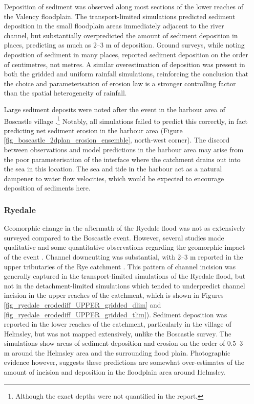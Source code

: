 Deposition of sediment was observed along most sections of the lower reaches of the Valency floodplain. The transport-limited simulations predicted sediment deposition in the small floodplain areas immediately adjacent to the river channel, but substantially overpredicted the amount of sediment deposition in places, predicting as much as 2--3 m of deposition. Ground surveys, while noting deposition of sediment in many places, reported sediment deposition on the order of centimetres, not metres. A similar overestimation of deposition was present in both the gridded and uniform rainfall simulations, reinforcing the conclusion that the choice and parameterisation of erosion law is a stronger controlling factor than the spatial heterogeneity of rainfall.

Large sediment deposits were noted after the event in the harbour area of Boscastle village \citep{wallingford2005flooding}.\footnote{Although the exact depths were not quantified in the report.} Notably, all simulations failed to predict this correctly, in fact predicting net sediment erosion in the harbour area (Figure \ref{fig_boscastle_2dplan_erosion_ensemble}, north-west corner). The discord between observations and model predictions in the harbour area may arise from the poor parameterisation of the interface where the catchment drains out into the sea in this location. The sea and tide in the harbour act as a natural dampener to water flow velocities, which would be expected to encourage deposition of sediments here.

\subsubsection{Ryedale}

Geomorphic change in the aftermath of the Ryedale flood was not as extensively surveyed compared to the Boscastle event. However, several studies made qualitative and some quantitative observations regarding the geomorphic impact of the event \citep{dong2006evaluation,wass2008investigation,hopkins2012knowledge}.
Channel downcutting was substantial, with 2--3 m reported in the upper tributaries of the Rye catchment \citep{wass2008investigation,hopkins2012knowledge}. This pattern of channel incision was generally captured in the transport-limited simulations of the Ryedale flood, but not in the detachment-limited simulations which tended to underpredict channel incision in the upper reaches of the catchment, which is shown in Figures \ref{fig_ryedale_erodediff_UPPER_gridded_dlim} and \ref{fig_ryedale_erodediff_UPPER_gridded_tlim}). Sediment deposition was reported in the lower reaches of the catchment, particularly in the village of Helmsley, but was not mapped extensively, unlike the Boscastle survey. The simulations show areas of sediment deposition and erosion on the order of 0.5--3 m around the Helmsley area and the surrounding flood plain. Photographic evidence \citep{dong2006evaluation,hopkins2012knowledge} however, suggests these predictions are somewhat over-estimates of the amount of incision and deposition in the floodplain area around Helmsley.

